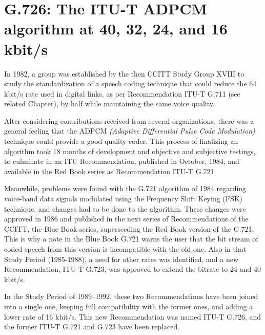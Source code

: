 \chapter{G.726: The ITU-T ADPCM algorithm at 40, 32, 24, and 16 kbit/s}

In 1982, a group was established by the then CCITT Study Group XVIII
to study the standardization of a speech coding technique that could
reduce the 64 kbit/s rate used in digital links, as per
Recommendation ITU-T G.711 (see related Chapter), by half while
maintaining the same voice quality.

After considering contributions received from several organizations, there was
a general feeling that the ADPCM {\em (Adaptive Differential Pulse Code
Modulation)} technique could provide a good quality coder. This process
of finalizing an algorithm took 18 months of development and objective
and subjective testings, to culminate in an ITU Recommendation,
published in October, 1984, and available in the Red Book series as
Recommendation ITU-T G.721.

Meanwhile, problems were found with the G.721 algorithm of 1984
regarding voice-band data signals modulated using the Frequency Shift
Keying (FSK) technique, and changes had to be done to the algorithm.
These changes were approved in 1986 and published in the next series of
Recommendations of the CCITT, the Blue Book series, superseeding the
Red Book version of the G.721. This is why a note in the Blue Book
G.721 warns the user that the bit stream of coded speech from this
version is incompatible with the old one. Also in that Study Period
(1985-1988), a need for other rates was identified, and a new
Recommendation, ITU-T G.723, was approved to extend the bitrate to 24 and 40
kbit/s.

In the Study Period of 1989--1992, these two Recommendations have been
joined into a single one, keeping full compatibility with the former
ones, and adding a lower rate of 16 kbit/s. This new Recommendation was
named ITU-T G.726, and the former ITU-T G.721 and G.723 have been replaced.

